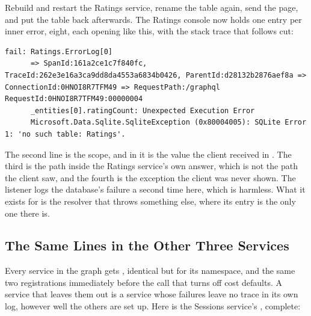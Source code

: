 %
Rebuild and restart the Ratings service, rename the table again, send the
page, and put the table back afterwards. The Ratings console now holds one
 entry per inner error, eight, each opening like this, with the
stack trace that follows cut:

\begin{verbatim}
fail: Ratings.ErrorLog[0]
      => SpanId:161a2ce1c7f840fc, TraceId:262e3e16a3ca9dd8da4553a6834b0426, ParentId:d28132b2876aef8a => ConnectionId:0HNOI8R7TFM49 => RequestPath:/graphql RequestId:0HNOI8R7TFM49:00000004
      _entities[0].ratingCount: Unexpected Execution Error
      Microsoft.Data.Sqlite.SqliteException (0x80004005): SQLite Error 1: 'no such table: Ratings'.
\end{verbatim}

%
The second line is the scope, and  in it is the value the client
received in . The third is the path inside the Ratings
service's own  answer, which is not the path the client saw,
and the fourth is the exception the client was never shown. The listener logs
the database's failure a second time here, which is harmless. What it exists
for is the resolver that throws something else, where its entry is the only
one there is.
%

\subsection{The Same Lines in the Other Three Services}

%
Every service in the graph gets , identical but for its
namespace, and the same two registrations immediately before the call that
turns off cost defaults. A service that leaves them out is a service whose
failures leave no trace in its own log, however well the others are set up.
Here is the Sessions service's , complete:

